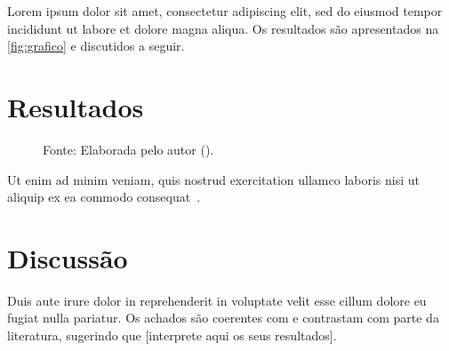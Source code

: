 
Lorem ipsum dolor sit amet, consectetur adipiscing elit, sed do eiusmod tempor
incididunt ut labore et dolore magna aliqua. Os resultados são apresentados na
\autoref{fig:grafico} e discutidos a seguir.

\section{Resultados}
\label{sec:resultados}

\begin{figure}[!htb]
  \centering
  {Fonte: Elaborada pelo autor (\the\year{}).}
\end{figure}

Ut enim ad minim veniam, quis nostrud exercitation ullamco laboris nisi ut
aliquip ex ea commodo consequat~\parencite{exemplo-artigo}.

\section{Discussão}
\label{sec:discussao}

Duis aute irure dolor in reprehenderit in voluptate velit esse cillum dolore eu
fugiat nulla pariatur. Os achados são coerentes com \textcite{exemplo-livro} e
contrastam com parte da literatura, sugerindo que [interprete aqui os seus
resultados].
